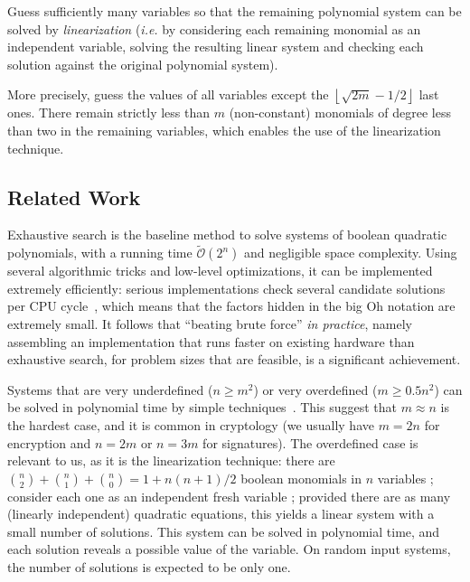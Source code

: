 \documentclass[a4paper,UKenglish,cleveref, autoref]{lipics-v2019}
\newcommand{\bigOsoft}[1]{\ensuremath{\mathcal{\tilde O}\left( #1 \right)} }
\begin{document}
\begin{framed}
  Guess sufficiently many variables so that the remaining polynomial system can
  be solved by \emph{linearization} (\textit{i.e.} by considering each remaining
  monomial as an independent variable, solving the resulting linear system and
  checking each solution against the original polynomial system).
\end{framed}

More precisely, guess the values of all variables except the
$\left\lfloor \sqrt{2m} - 1/2 \right\rfloor$ last ones. There remain strictly
less than $m$ (non-constant) monomials of degree less than two in the remaining
variables, which enables the use of the linearization technique.

\subsection{Related Work}

Exhaustive search is the baseline method to solve systems of boolean quadratic
polynomials, with a running time $\bigOsoft{2^n}$ and negligible space
complexity. Using several algorithmic tricks and low-level optimizations, it can
be implemented extremely efficiently: serious implementations check several
candidate solutions per CPU cycle~\cite{BouillaguetCCCNSY10}, which means that
the factors hidden in the big Oh notation are extremely small. It follows that
``beating brute force'' \emph{in practice}, namely assembling an implementation
that runs faster on existing hardware than exhaustive search, for problem sizes
that are feasible, is a significant achievement.

Systems that are very underdefined ($n \geq m^2$) or very overdefined
($m \geq 0.5 n^2$) can be solved in polynomial time by simple
techniques~\cite{CourtoisGMT02}. This suggest that $m \approx n$ is the hardest
case, and it is common in cryptology (we usually have $m=2n$ for encryption and
$n = 2m$ or $n=3m$ for signatures). The overdefined case is relevant to us, as
it is the linearization technique: there are
$\binom{n}{2} + \binom{n}{1} + \binom{n}{0} = 1 + n(n+1)/2$ boolean monomials in
$n$ variables ; consider each one as an independent fresh variable ; provided
there are as many (linearly independent) quadratic equations, this yields a
linear system with a small number of solutions. This system can be solved in
polynomial time, and each solution reveals a possible value of the variable. On
random input systems, the number of solutions is expected to be only one.
\end{document}
